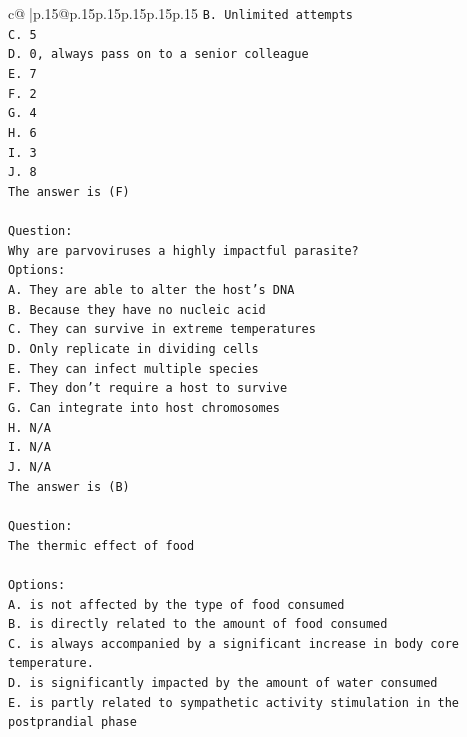 \documentclass{article}
\begin{document}
{\begin{supertabular}{c@{$\;$}|p{.15\linewidth}@{}p{.15\linewidth}p{.15\linewidth}p{.15\linewidth}p{.15\linewidth}p{.15\linewidth}}
{{{\texttt{B. Unlimited attempts} \\
\texttt{C. 5} \\
\texttt{D. 0, always pass on to a senior colleague} \\
\texttt{E. 7} \\
\texttt{F. 2} \\
\texttt{G. 4} \\
\texttt{H. 6} \\
\texttt{I. 3} \\
\texttt{J. 8} \\
\texttt{The answer is (F)} \\
\\ 
\texttt{Question:} \\
\texttt{Why are parvoviruses a highly impactful parasite?} \\
\texttt{Options:} \\
\texttt{A. They are able to alter the host's DNA} \\
\texttt{B. Because they have no nucleic acid} \\
\texttt{C. They can survive in extreme temperatures} \\
\texttt{D. Only replicate in dividing cells} \\
\texttt{E. They can infect multiple species} \\
\texttt{F. They don't require a host to survive} \\
\texttt{G. Can integrate into host chromosomes} \\
\texttt{H. N/A} \\
\texttt{I. N/A} \\
\texttt{J. N/A} \\
\texttt{The answer is (B)} \\
\\ 
\texttt{Question:} \\
\texttt{The thermic effect of food} \\
\\ 
\texttt{Options:} \\
\texttt{A. is not affected by the type of food consumed} \\
\texttt{B. is directly related to the amount of food consumed} \\
\texttt{C. is always accompanied by a significant increase in body core temperature.} \\
\texttt{D. is significantly impacted by the amount of water consumed} \\
\texttt{E. is partly related to sympathetic activity stimulation in the postprandial phase} \\
}}}
\end{supertabular}}
\end{document}

